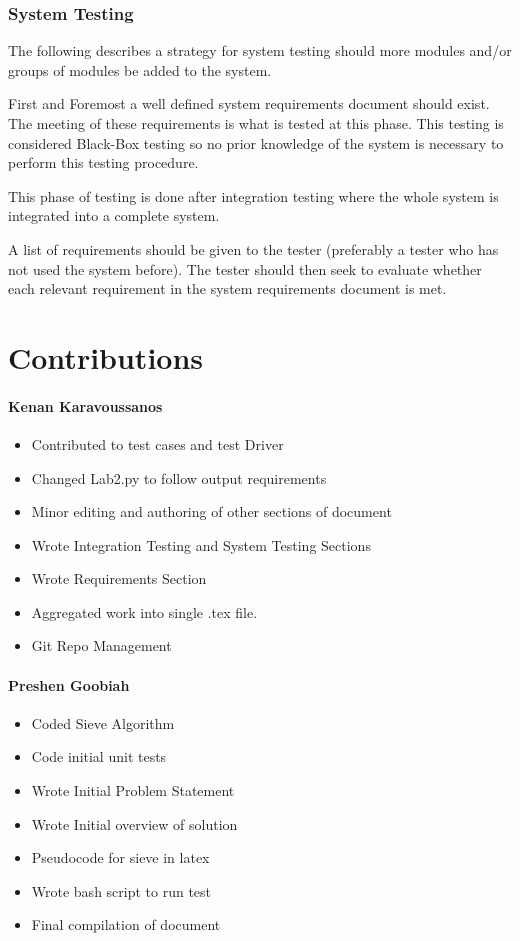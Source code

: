 \documentclass[]{article}
\begin{document}
\subsubsection{System Testing}

The following describes a strategy for system testing should more modules and/or groups of modules be added to the system.

First and Foremost a well defined system requirements document should exist. The meeting of these requirements is what is tested at this phase. This testing is considered Black-Box testing so no prior knowledge of the system is necessary to perform this testing procedure.

This phase of testing is done after integration testing where the whole system is integrated into a complete system.

A list of requirements should be given to the tester (preferably a tester who has not used the system before). The tester should then seek to evaluate whether each relevant requirement in the system requirements document is met. 

\section{Contributions}

\paragraph{Kenan Karavoussanos}
\begin{itemize}


	\item Contributed to test cases and test Driver
	\item Changed Lab2.py to follow output requirements
	\item Minor editing and authoring of other sections of document
	\item Wrote Integration Testing and System Testing Sections
	\item Wrote Requirements Section
	\item Aggregated work into single .tex file.
	\item Git Repo Management
\end{itemize}
\paragraph{Preshen Goobiah}
\begin{itemize}
	\item	Coded Sieve Algorithm
	\item	Code initial unit tests
	\item	Wrote Initial Problem Statement
\item	Wrote Initial overview of solution
\item	Pseudocode for sieve in latex
\item	Wrote bash script to run test
\item	Final compilation of document
\end{itemize}
\end{document}
